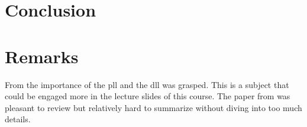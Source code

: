 \section{Conclusion} \label{sec:conclusion}





\section{Remarks}
From \cite{agrawal20098} the importance of the \ac{pll} and the \ac{dll} was grasped. 
This is a subject that could be engaged more in the lecture slides of this course.
The paper from \cite{agrawal20098} was pleasant to review but relatively hard to summarize without diving into too much details.